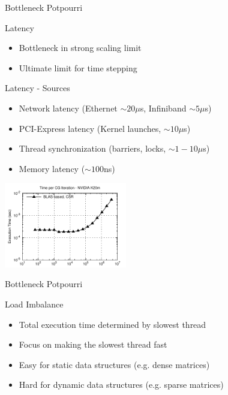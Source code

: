 \begin{frame}[fragile]{Bottleneck Potpourri}

 \begin{block}{Latency}
  \begin{itemize}
   \item Bottleneck in strong scaling limit
   \item Ultimate limit for time stepping
  \end{itemize}
 \end{block}

 \begin{block}{Latency - Sources}
  \begin{itemize}
   \item Network latency (Ethernet $\sim 20 \mu$s, Infiniband $\sim 5 \mu$s)
   \item PCI-Express latency (Kernel launches, $\sim 10 \mu$s)
   \item Thread synchronization (barriers, locks, $\sim 1-10 \mu$s)
   \item Memory latency ($\sim 100$ns)
  \end{itemize}
 \end{block}

 \begin{center}
   \vspace*{-0.5cm}
   \includegraphics[width=0.4\textwidth]{figures/cg-k20m-0}
 \end{center}

\end{frame}




\begin{frame}[fragile]{Bottleneck Potpourri}

 \begin{block}{Load Imbalance}
  \begin{itemize}
   \item Total execution time determined by slowest thread
   \item Focus on making the slowest thread fast
   \item Easy for static data structures (e.g. dense matrices)
   \item Hard for dynamic data structures (e.g. sparse matrices)
  \end{itemize}
 \end{block}


\end{frame}


